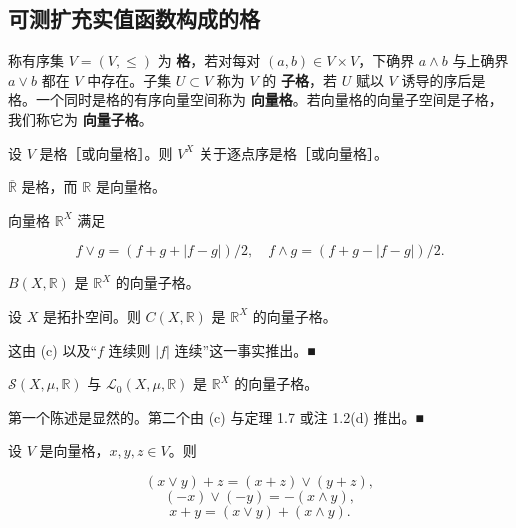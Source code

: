 \subsection*{可测扩充实值函数构成的格}

称有序集 $ V = (V,\le) $ 为 \textbf{格}，若对每对 $ (a,b) \in V \times V $，下确界 $ a \wedge b $ 与上确界 $ a \vee b $ 都在 $ V $ 中存在。子集 $ U \subset V $ 称为 $ V $ 的 \textbf{子格}，若 $ U $ 赋以 $ V $ 诱导的序后是格。一个同时是格的有序向量空间称为 \textbf{向量格}。若向量格的向量子空间是子格，我们称它为 \textbf{向量子格}。

\begin{example}

\begin{items}
\item

设 $ V $ 是格［或向量格］。则 $ V^X $ 关于逐点序是格［或向量格］。

\item

$ \overline{\mathbb{R}} $ 是格，而 $ \mathbb{R} $ 是向量格。

\item

向量格 $ \mathbb{R}^X $ 满足

\[
f \vee g = (f + g + |f - g|)/2 , \quad f \wedge g = (f + g - |f - g|)/2 .
\]
\item

$ B(X,\mathbb{R}) $ 是 $ \mathbb{R}^X $ 的向量子格。

\item

设 $ X $ 是拓扑空间。则 $ C(X,\mathbb{R}) $ 是 $ \mathbb{R}^X $ 的向量子格。

\proofhead
这由 (c) 以及“$ f $ 连续则 $ |f| $ 连续”这一事实推出。\nobreak\hspace{0.35em}■
\item

$ \mathcal{S}(X,\mu,\mathbb{R}) $ 与 $ \mathcal{L}_0(X,\mu,\mathbb{R}) $ 是 $ \mathbb{R}^X $ 的向量子格。

\proofhead
第一个陈述是显然的。第二个由 (c) 与定理 1.7 或注 1.2(d) 推出。\nobreak\hspace{0.35em}■
\item

设 $ V $ 是向量格，$ x, y, z \in V $。则

\[
(x \vee y) + z = (x + z) \vee (y + z) ,
\]
\[
(-x) \vee (-y) = -(x \wedge y) ,
\]
\[
x + y = (x \vee y) + (x \wedge y) .
\]


\end{items}
\end{example}
